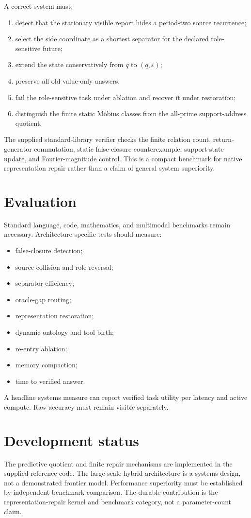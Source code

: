 \documentclass[11pt,a4paper]{article}
\begin{document}
A correct system must:
\begin{enumerate}
\item detect that the stationary visible report hides a period-two source recurrence;
\item select the side coordinate as a shortest separator for the declared role-sensitive future;
\item extend the state conservatively from $q$ to $(q,\varepsilon)$;
\item preserve all old value-only answers;
\item fail the role-sensitive task under ablation and recover it under restoration;
\item distinguish the finite static M\"obius classes from the all-prime support-address quotient.
\end{enumerate}
The supplied standard-library verifier checks the finite relation count, return-generator commutation, static false-closure counterexample, support-state update, and Fourier-magnitude control. This is a compact benchmark for native representation repair rather than a claim of general system superiority.

\section{Evaluation}
Standard language, code, mathematics, and multimodal benchmarks remain necessary. Architecture-specific tests should measure:
\begin{itemize}
\item false-closure detection;
\item source collision and role reversal;
\item separator efficiency;
\item oracle-gap routing;
\item representation restoration;
\item dynamic ontology and tool birth;
\item re-entry ablation;
\item memory compaction;
\item time to verified answer.
\end{itemize}
A headline systems measure can report verified task utility per latency and active compute. Raw accuracy must remain visible separately.

\section{Development status}
The predictive quotient and finite repair mechanisms are implemented in the supplied reference code. The large-scale hybrid architecture is a systems design, not a demonstrated frontier model. Performance superiority must be established by independent benchmark comparison. The durable contribution is the representation-repair kernel and benchmark category, not a parameter-count claim.
\end{document}
